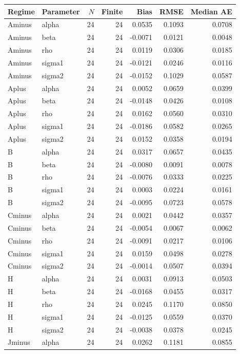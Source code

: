 \begin{tabular}{llrrrrr}
\toprule
Regime & Parameter & $N$ & Finite & Bias & RMSE & Median AE \\
\midrule
Aminus & alpha & 24 & 24 & 0.0535 & 0.1093 & 0.0708 \\
Aminus & beta & 24 & 24 & -0.0071 & 0.0121 & 0.0048 \\
Aminus & rho & 24 & 24 & 0.0119 & 0.0306 & 0.0185 \\
Aminus & sigma1 & 24 & 24 & -0.0121 & 0.0246 & 0.0116 \\
Aminus & sigma2 & 24 & 24 & -0.0152 & 0.1029 & 0.0587 \\
Aplus & alpha & 24 & 24 & 0.0052 & 0.0659 & 0.0399 \\
Aplus & beta & 24 & 24 & -0.0148 & 0.0426 & 0.0108 \\
Aplus & rho & 24 & 24 & 0.0162 & 0.0560 & 0.0310 \\
Aplus & sigma1 & 24 & 24 & -0.0186 & 0.0582 & 0.0265 \\
Aplus & sigma2 & 24 & 24 & 0.0152 & 0.0358 & 0.0194 \\
B & alpha & 24 & 24 & 0.0317 & 0.0657 & 0.0435 \\
B & beta & 24 & 24 & -0.0080 & 0.0091 & 0.0078 \\
B & rho & 24 & 24 & -0.0076 & 0.0333 & 0.0225 \\
B & sigma1 & 24 & 24 & 0.0003 & 0.0224 & 0.0161 \\
B & sigma2 & 24 & 24 & -0.0095 & 0.0723 & 0.0578 \\
Cminus & alpha & 24 & 24 & 0.0021 & 0.0442 & 0.0357 \\
Cminus & beta & 24 & 24 & -0.0054 & 0.0067 & 0.0062 \\
Cminus & rho & 24 & 24 & -0.0091 & 0.0217 & 0.0106 \\
Cminus & sigma1 & 24 & 24 & 0.0159 & 0.0498 & 0.0278 \\
Cminus & sigma2 & 24 & 24 & -0.0014 & 0.0507 & 0.0394 \\
H & alpha & 24 & 24 & 0.0031 & 0.0913 & 0.0503 \\
H & beta & 24 & 24 & -0.0168 & 0.0455 & 0.0317 \\
H & rho & 24 & 24 & 0.0245 & 0.1170 & 0.0850 \\
H & sigma1 & 24 & 24 & -0.0125 & 0.0559 & 0.0370 \\
H & sigma2 & 24 & 24 & -0.0038 & 0.0378 & 0.0245 \\
Jminus & alpha & 24 & 24 & 0.0262 & 0.1181 & 0.0855 \\

\end{tabular}
